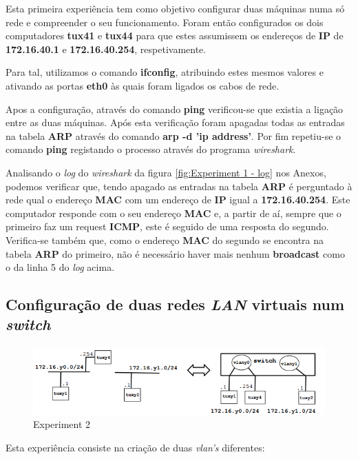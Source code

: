 \documentclass[a4paper]{article}
\begin{document}
	Esta primeira experiência tem como objetivo configurar duas máquinas numa só rede e compreender o seu funcionamento. Foram então configurados os dois computadores \textbf{tux41} e \textbf{tux44} para que estes assumissem os endereços de \textbf{IP} de \textbf{172.16.40.1} e \textbf{172.16.40.254}, respetivamente.

Para tal, utilizamos o comando \textbf{ifconfig}, atribuindo estes mesmos valores e ativando as portas \textbf{eth0} às quais foram ligados os cabos de rede.

Apos a configuração, através do comando \textbf{ping} verificou-se que existia a ligação entre as duas máquinas. Após esta verificação foram apagadas todas as entradas na tabela \textbf{ARP} através do comando \textbf{arp -d 'ip address'}. Por fim repetiu-se o comando \textbf{ping} registando o processo através do programa \textit{wireshark}.

	Analisando o \textit{log} do \textit{wireshark} da figura \ref{fig:Experiment 1 - log} nos Anexos, podemos verificar que, tendo apagado as entradas na tabela \textbf{ARP} é perguntado à rede qual o endereço \textbf{MAC} com um endereço de \textbf{IP} igual a \textbf{172.16.40.254}. Este computador responde com o seu endereço \textbf{MAC} e, a partir de aí, sempre que o primeiro faz um request \textbf{ICMP}, este é seguido de uma resposta do segundo. Verifica-se também que, como o endereço \textbf{MAC} do segundo se encontra na tabela \textbf{ARP} do primeiro, não é necessário haver mais nenhum \textbf{broadcast} como o da linha 5 do \textit{log} acima.

	\subsection{Configuração de duas redes \textit{LAN} virtuais num \textit{switch}}

	\begin{figure}[H]
	\begin{center}
  	\includegraphics[width=0.8\linewidth]{exp2.png}
  	\caption{Experiment 2}
  	\label{fig:Experiment 2}
	\end{center}
	\end{figure}

	Esta experiência consiste na criação de duas \textit{vlan's} diferentes:
\end{document}
